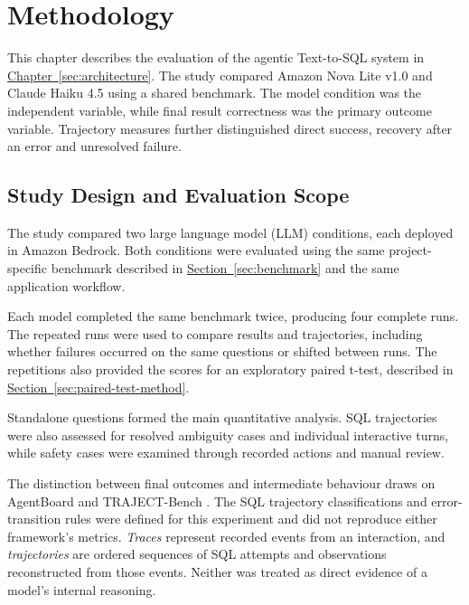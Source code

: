 \section{Methodology}
\label{sec:methodology}

This chapter describes the evaluation of the agentic Text-to-SQL system in
\hyperref[sec:architecture]{Chapter~\ref*{sec:architecture}}.
The study compared Amazon Nova Lite v1.0 and Claude Haiku
4.5 using a shared benchmark. The model condition
was the independent variable, while final result
correctness was the primary outcome variable. Trajectory measures further
distinguished direct success, recovery after an error and unresolved failure.

\subsection{Study Design and Evaluation Scope}
\label{sec:study-design}

The study compared two large language model (LLM) conditions,
each deployed in Amazon Bedrock. 
Both conditions were evaluated
using the same project-specific benchmark described in
\hyperref[sec:benchmark]{Section~\ref*{sec:benchmark}} and the same application workflow.

Each model completed the same benchmark twice, producing four complete runs.
The repeated runs were used to compare results and trajectories, including
whether failures occurred on the same questions or shifted between runs.
The repetitions also provided the scores for an exploratory paired t-test,
described in \hyperref[sec:paired-test-method]{Section~\ref*{sec:paired-test-method}}.

Standalone questions formed the main quantitative analysis. SQL trajectories
were also assessed for resolved ambiguity cases and individual interactive
turns, while safety cases were examined through recorded actions and manual review.

The distinction between final outcomes and intermediate behaviour draws on
AgentBoard and TRAJECT-Bench \citep{ma2024agentboard,he2026trajectbench}.
The SQL trajectory classifications and error-transition rules were defined for
this experiment and did not reproduce either framework's metrics.
\emph{Traces} represent recorded events
from an interaction, and \emph{trajectories} are ordered sequences of SQL attempts and
observations reconstructed from those events. Neither was treated as direct
evidence of a model's internal reasoning.


